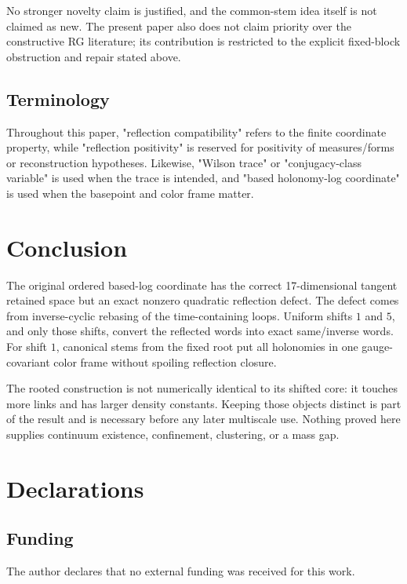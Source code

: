 \documentclass[10pt]{article}
\begin{document}
No stronger novelty claim is justified, and the common-stem idea itself is not claimed as new.  The present paper also does not claim priority over the constructive RG literature; its contribution is restricted to the explicit fixed-block obstruction and repair stated above.

\subsection{Terminology}

Throughout this paper, "reflection compatibility" refers to the finite coordinate property, while "reflection positivity" is reserved for positivity of measures/forms or reconstruction hypotheses.  Likewise, "Wilson trace" or "conjugacy-class variable" is used when the trace is intended, and "based holonomy-log coordinate" is used when the basepoint and color frame matter.

\section{Conclusion}

The original ordered based-log coordinate has the correct 17-dimensional tangent retained space but an exact nonzero quadratic reflection defect.  The defect comes from inverse-cyclic rebasing of the time-containing loops.  Uniform shifts \(1\) and \(5\), and only those shifts, convert the reflected words into exact same/inverse words.  For shift \(1\), canonical stems from the fixed root put all holonomies in one gauge-covariant color frame without spoiling reflection closure.

The rooted construction is not numerically identical to its shifted core: it touches more links and has larger density constants.  Keeping those objects distinct is part of the result and is necessary before any later multiscale use.  Nothing proved here supplies continuum existence, confinement, clustering, or a mass gap.

\section{Declarations}

\subsection{Funding}

The author declares that no external funding was received for this work.
\end{document}
